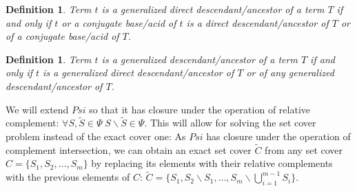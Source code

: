 \documentclass[10pt]{bmc_article}
\newenvironment{bmcformat}{\baselineskip20pt\sloppy\setboolean{publ}{false}}{\baselineskip20pt\sloppy}
\begin{document}
\begin{bmcformat}
\newtheorem{dirgent}{Definition}
\begin{dirgent}
Term $t$ is a generalized direct descendant/ancestor of a term $T$ if and only if $t$ or a conjugate base/acid of $t$ is a direct descendant/ancestor of $T$ or of a conjugate base/acid of $T$.
\end{dirgent} 

\newtheorem{gent}{Definition}
\begin{gent}
Term $t$ is a generalized descendant/ancestor of a term $T$ if and only if $t$ is a generalized direct descendant/ancestor of $T$ or of any generalized descendant/ancestor of $T$.
\end{gent} 



We will extend $Psi$ so that it has closure under the operation of relative complement: $\forall S,\tilde{S} \in \Psi \; S\backslash\tilde{S} \in \Psi$. This will allow for solving the set cover problem instead of the exact cover one:  As $Psi$ has closure under the operation of complement intersection, we can obtain an exact set cover $\tilde{C}$ from any set cover $C = \{S_1, S_2, \ldots, S_m\}$ by replacing its elements with their relative complements with the previous elements of $C$: $\tilde{C} = \{S_1, S_2 \backslash S_1, \ldots, S_m \backslash \bigcup^{m - 1}_{i = 1}{S_i}\}$.


\end{bmcformat}
\end{document}
